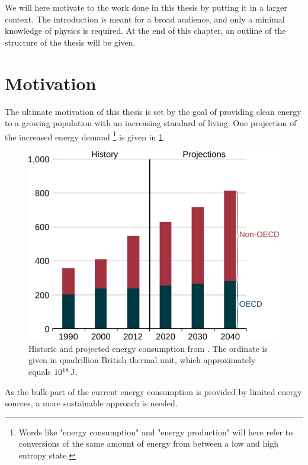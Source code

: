 %
We will here motivate to the work done in this thesis by putting it in a larger context.
The introduction is meant for a broad audience, and only a minimal knowledge of physics is required.
At the end of this chapter, an outline of the structure of the thesis will be given.

\section{Motivation}
%
The ultimate motivation of this thesis is set by the goal of providing clean energy to a growing population with an increasing standard of living.
One projection of the increased energy demand%
\footnote{Words like "energy consumption" and "energy production" will here refer to conversions of the same amount of energy from between a low and high entropy state.}
is given in \cref{fig:energyDemand}.
%
\begin{figure}[htb]
    \begin{center}
        \includegraphics{fig/intro/energyDemand}
    \end{center}
    \caption{Historic and projected energy consumption from \cite{UEIA2016book}.
    The ordinate is given in quadrillion British thermal unit, which approximately equals $10^{18} \, \text{J}$.
    }
    \label{fig:energyDemand}
\end{figure}

\noindent
As the bulk-part of the current energy consumption is provided by limited energy sources, a more sustainable approach is needed.


